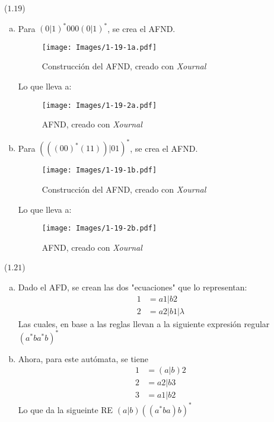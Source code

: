 \begin{mdframed}[style = warning]
	\begin{problem}
		($1.19$) 	 
		\begin{enumerate}[a)]
			\item Para $(0|1)^*000(0|1)^*$, se crea el AFND.
				\begin{figure}[H]
					\centering
					\texttt{[image: Images/1-19-1a.pdf]}
					\caption{Construcción del AFND, creado con \textit{Xournal}}
					\label{19-1a}
				\end{figure}
			Lo que lleva a:
				\begin{figure}[H]
					\centering
					\texttt{[image: Images/1-19-2a.pdf]}
					\caption{AFND, creado con \textit{Xournal}}
					\label{19-2a}
				\end{figure}
			\item Para $(((00)^*(11))|01)^*$, se crea el AFND.
				\begin{figure}[H]
					\centering
					\texttt{[image: Images/1-19-1b.pdf]}
					\caption{Construcción del AFND, creado con \textit{Xournal}}
					\label{19-1b}
				\end{figure}
			Lo que lleva a:
				\begin{figure}[H]
					\centering
					\texttt{[image: Images/1-19-2b.pdf]}
					\caption{AFND, creado con \textit{Xournal}}
					\label{19-2b}
				\end{figure}
		\end{enumerate}
	\end{problem}
\end{mdframed}












\begin{mdframed}[style = warning]
	\begin{problem}
		($1.21$) 	
		\begin{enumerate}[a)]
			\item Dado el AFD, se crean las dos "ecuaciones" que lo representan:
				\begin{align*}
					1 &= a1|b2 \\
					2 &= a2|b1|\lambda
				\end{align*}
				Las cuales, en base a las reglas llevan a la siguiente expresión regular $\boxed{(a^*ba^*b)^*}$
			\item Ahora, para este autómata, se tiene
				\begin{align*}
					1 &= (a|b)2 \\
					2 &= a2|b3 \\
					3 &= a1|b2
				\end{align*}
			Lo que da la sigueinte RE $\boxed{(a|b)((a^*ba)b)^*}$
		\end{enumerate}
	\end{problem}
\end{mdframed}







